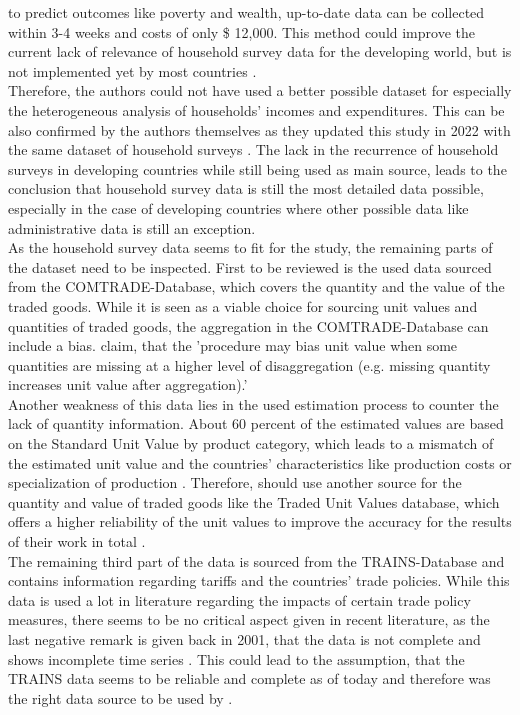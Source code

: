 to predict outcomes like poverty and wealth, up-to-date data can be collected within 3-4 weeks and costs of only \$ 12,000. This method could improve
the current lack of relevance of household survey data for the developing world, but is not implemented yet by most countries \parencite[p.~1076]{Blumenstock.2015}.\\ 
Therefore, the authors could not have used a better possible dataset for
especially the heterogeneous analysis of households' incomes and expenditures. This can be also confirmed by the authors themselves
as they updated this study in 2022 with the same dataset of household surveys \parencite[pp.~14-15]{Artuc.2022}. The lack in the recurrence of 
household surveys in developing countries while still being used as main source, leads to the conclusion that household survey data is still 
the most detailed data possible, especially in the case of developing countries where other possible data like administrative data is still an 
exception.\\

As the household survey data seems to fit for the study, the remaining parts of the dataset need to be inspected.
First to be reviewed is the used data sourced from the COMTRADE-Database, which covers the quantity and the value of the traded goods. While it
 is seen as a viable choice for sourcing unit values and quantities of traded goods, the aggregation in the COMTRADE-Database can include a 
 bias. \cite[p.~107]{Berthou.2011} claim, that the 'procedure may bias unit value when some quantities are missing at a higher level of disaggregation
(e.g. missing quantity increases unit value after aggregation).'\\
Another weakness of this data lies in the used estimation process to counter
the lack of quantity information. About 60 percent of the estimated values are based on the Standard Unit Value by product category, which leads
to a mismatch of the estimated unit value and the countries' characteristics like production costs or specialization of production \parencite[p.~107]{Berthou.2011}.
Therefore, \Cite{Artuc.2019} should use another source for the quantity and value of traded goods like the Traded Unit Values database, which
offers a higher reliability of the unit values to improve the accuracy for the results of their work in total \parencite[p.~113]{Berthou.2011}.\\

The remaining third part of the data is sourced from the TRAINS-Database and contains information regarding tariffs and the countries' trade
policies. While this data is used a lot in literature regarding the impacts of certain trade policy measures, there seems to be no critical
aspect given in recent literature, as the last negative remark is given back in 2001, that the data is not complete and shows incomplete time series
\parencite[p.~6]{Olarreaga.2001}. This could lead to the assumption, that the TRAINS data seems to be reliable and complete as of today
and therefore was the right data source to be used by \cite{Artuc.2019}.\\ 

